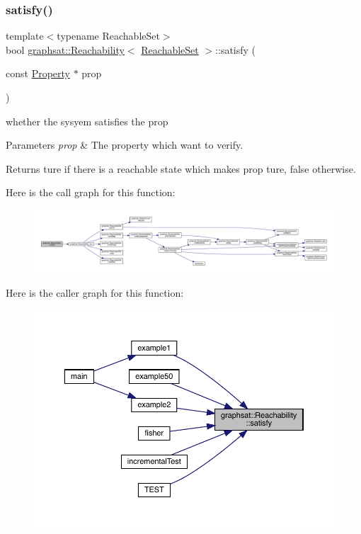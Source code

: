 \subsubsection{\texorpdfstring{satisfy()}{satisfy()}}
{\footnotesize\ttfamily template$<$typename Reachable\+Set$>$ \\
bool \mbox{\hyperlink{classgraphsat_1_1_reachability}{graphsat\+::\+Reachability}}$<$ \mbox{\hyperlink{classgraphsat_1_1_reachable_set}{Reachable\+Set}} $>$\+::satisfy (\begin{DoxyParamCaption}\item[{const \mbox{\hyperlink{classgraphsat_1_1_property}{Property}} $\ast$}]{prop }\end{DoxyParamCaption})\hspace{0.3cm}{\ttfamily [inline]}}



whether the sysyem satisfies the prop 


\begin{DoxyParams}{Parameters}
{\em prop} & The property which want to verify.\\
\hline
\end{DoxyParams}
\begin{DoxyReturn}{Returns}
ture if there is a reachable state which makes prop ture, false otherwise. 
\end{DoxyReturn}
Here is the call graph for this function\+:
\nopagebreak
\begin{figure}[H]
\begin{center}
\leavevmode
\includegraphics[width=350pt]{classgraphsat_1_1_reachability_abeea89b7c1d9d21616ff3efb31c5c4f2_cgraph}
\end{center}
\end{figure}
Here is the caller graph for this function\+:
\nopagebreak
\begin{figure}[H]
\begin{center}
\leavevmode
\includegraphics[width=350pt]{classgraphsat_1_1_reachability_abeea89b7c1d9d21616ff3efb31c5c4f2_icgraph}
\end{center}
\end{figure}


